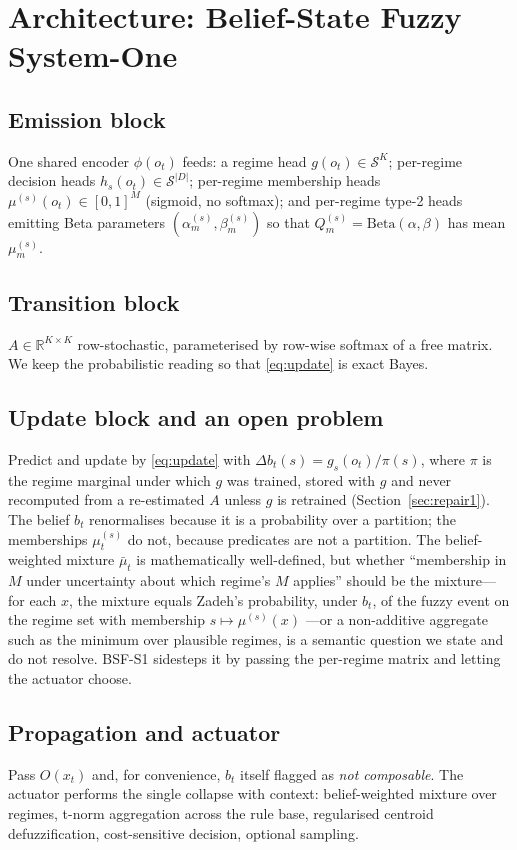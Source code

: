 \documentclass[11pt,a4paper]{article}
\numberwithin{equation}{section}
\theoremstyle{plain}
\theoremstyle{definition}
\theoremstyle{remark}
\newcommand{\R}{\mathbb{R}}
\newcommand{\simplex}{\mathcal{S}}
\begin{document}
\section{Architecture: Belief-State Fuzzy System-One}\label{sec:arch}

\subsection{Emission block}
One shared encoder $\phi(o_t)$ feeds: a regime head $g(o_t)\in\simplex^K$; per-regime decision heads $h_s(o_t)\in\simplex^{|D|}$; per-regime membership heads $\mu^{(s)}(o_t)\in[0,1]^M$ (sigmoid, no softmax); and per-regime type-2 heads emitting Beta parameters $(\alpha_m^{(s)},\beta_m^{(s)})$ so that $Q_m^{(s)}=\mathrm{Beta}(\alpha,\beta)$ has mean $\mu_m^{(s)}$.

\subsection{Transition block}
$A\in\R^{K\times K}$ row-stochastic, parameterised by row-wise softmax of a free matrix. We keep the probabilistic reading so that \eqref{eq:update} is exact Bayes.

\subsection{Update block and an open problem}\label{sec:open}
Predict and update by \eqref{eq:update} with $\Delta b_t(s)=g_s(o_t)/\pi(s)$, where $\pi$ is the regime marginal under which $g$ was trained, stored with $g$ and never recomputed from a re-estimated $A$ unless $g$ is retrained (Section~\ref{sec:repair1}). The belief $b_t$ renormalises because it is a probability over a partition; the memberships $\mu_t^{(s)}$ do not, because predicates are not a partition. The belief-weighted mixture $\bar\mu_t$ is mathematically well-defined, but whether ``membership in $M$ under uncertainty about which regime's $M$ applies'' should be the mixture---for each $x$, the mixture equals Zadeh's probability, under $b_t$, of the fuzzy event on the regime set with membership $s\mapsto\mu^{(s)}(x)$ \citep{zadeh1968}---or a non-additive aggregate such as the minimum over plausible regimes, is a semantic question we state and do not resolve. BSF-S1 sidesteps it by passing the per-regime matrix and letting the actuator choose.

\subsection{Propagation and actuator}
Pass $O(x_t)$ and, for convenience, $b_t$ itself flagged as \emph{not composable}. The actuator performs the single collapse with context: belief-weighted mixture over regimes, t-norm aggregation across the rule base, regularised centroid defuzzification, cost-sensitive decision, optional sampling.
\end{document}
